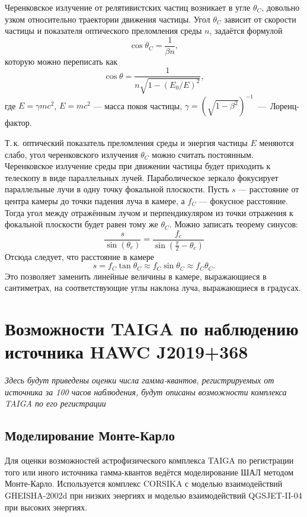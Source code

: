 \documentclass[magd,floatypics,numeref]{msudipl} %
\begin{document}
Черенковское излучение от релятивистских частиц возникает в угле $\theta_C$, довольно узком относительно траектории движения частицы. Угол $\theta_C$ зависит от скорости частицы и показателя оптического преломления среды $n$, задаётся формулой
\begin{equation}
\cos \theta_C=\frac{1}{\beta n},
\end{equation}
которую можно переписать как
\begin{equation}
\cos \theta=\frac{1}{n \sqrt{1-\left(E_{0} / E\right)^{2}}},
\end{equation}
где $E = \gamma m c^2$, $E = mc^2$ --- масса покоя частицы, $\gamma = \left(\sqrt{1-\beta^2}\right)^{-1}$~---~Лоренц-фактор. 

Т.\,к. оптический показатель преломления среды и энергия частицы $E$ меняются слабо, угол черенковского излучения $\theta_C$ можно считать постоянным. Черенковское излучение среды при движении частицы будет приходить к телескопу в виде параллельных лучей.  Параболическое зеркало фокусирует параллельные лучи в одну точку фокальной плоскости. Пусть $s$ --- расстояние от центра камеры до точки падения луча в камере, а $f_C$ --- фокусное расстояние. Тогда угол между отражённым лучом и перпендикуляром из точки отражения к фокальной плоскости будет равен тому же $\theta_C$.  Можно записать теорему синусов:
\begin{equation}
\frac{s}{\sin \left(\theta_{c}\right)}=\frac{f_{c}}{\sin \left(\frac{\pi}{2}-\theta_{c}\right)}
\end{equation}
Отсюда следует, что расстояние в камере 
\begin{equation}
\label{cm2degree}
s = f_C \tan \theta_C \approx f_C \sin \theta_C \approx f_C \theta_C.
\end{equation}
Это позволяет заменить линейные величины в камере, выражающиеся в сантиметрах, на соответствующие углы наклона луча, выражающиеся в градусах. 
\section{Возможности TAIGA по наблюдению источника HAWC J2019+368}
\textit{
Здесь будут приведены оценки числа гамма-квантов, регистрируемых от источника за 100 часов наблюдения, будут описаны возможности комплекса TAIGA по его регистрации
}
\subsection{Моделирование Монте-Карло}
Для оценки возможностей астрофизического комплекса TAIGA по регистрации того или иного источника гамма-квантов ведётся моделирование ШАЛ методом Монте-Карло. Используется комплекс CORSIKA \cite{heck1998corsika} с моделью взаимодействий GHEISHA-2002d \cite{fesefeldt1985simulation} при низких энергиях и моделью взаимодействий QGSJET-II-04 \cite{ostapchenko2011monte} при высоких энергиях. 
\end{document}
